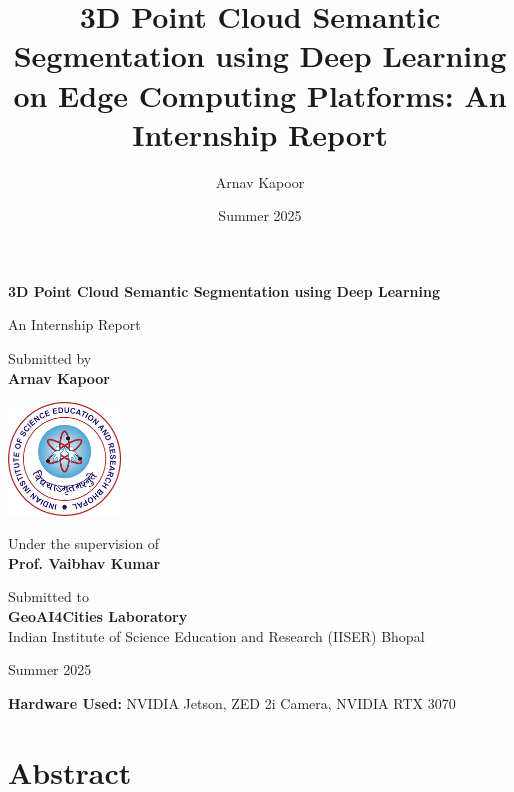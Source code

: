 \documentclass[12pt,a4paper]{report}
\title{3D Point Cloud Semantic Segmentation using Deep Learning on Edge Computing Platforms: An Internship Report}
\author{Arnav Kapoor}
\date{Summer 2025}
\begin{document}
\begin{titlepage}
    \centering
    \vspace*{1cm}
    
    {\LARGE\textbf{3D Point Cloud Semantic Segmentation using Deep Learning}}
    
    \vspace{0.5cm}
    {\Large An Internship Report}
    
    \vspace{2cm}
    
    {\large Submitted by}\\
    \vspace{0.5cm}
    {\Large\textbf{Arnav Kapoor}}
    
    \vspace{2cm}
    
    \includegraphics[width=3cm]{logo.png}
    
    \vspace{1cm}
    
    {\large Under the supervision of}\\
    \vspace{0.5cm}
    {\Large\textbf{Prof. Vaibhav Kumar}}
    
    \vspace{2cm}
    
    {\large Submitted to}\\
    \vspace{0.5cm}
    {\Large\textbf{GeoAI4Cities Laboratory}}\\
    {\large Indian Institute of Science Education and Research (IISER) Bhopal}
    
    \vspace{2cm}
    
    {\large Summer 2025}
    
    \vfill
    
    {\large \textbf{Hardware Used:} NVIDIA Jetson, ZED 2i Camera, NVIDIA RTX 3070}
    
\end{titlepage}

\newpage
\chapter*{Abstract}
\end{document}
